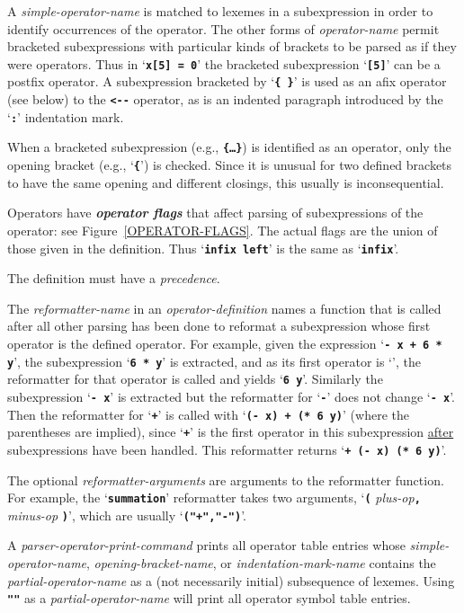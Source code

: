 \documentclass[12pt]{article}
\newcommand{\TT}[1]{{\tt \bfseries #1}}
\newcommand{\skey}[2]{{\bf \em #1#2}\index{#1}}
\begin{document}
A {\em simple-operator-name} is matched to lexemes in a subexpression
in order to identify occurrences of the operator.
The other forms of {\em operator-name} permit bracketed subexpressions
with particular kinds of brackets to be parsed as if they were operators.
Thus in `\TT{x[5] = 0}' the bracketed subexpression
`\TT{[5]}' can be a postfix operator.  A subexpression
bracketed by `\TT{\{ \}}' is used as an afix operator (see below) to the
\TT{<-{}-} operator, as is an indented paragraph introduced by the `\TT{:}'
indentation mark.

When a bracketed subexpression (e.g., \TT{\{\ldots\}}) is identified as
an operator, only the opening bracket (e.g., `\TT{\{}') is checked.
Since it is unusual for two defined brackets to have the same opening
and different closings, this usually is inconsequential.

Operators have \skey{operator flag}s that
affect parsing of subexpressions of the operator:
see Figure~\ref{OPERATOR-FLAGS}.
The actual flags are the union of those given in the definition.
Thus `\TT{infix left}' is the same as `\TT{infix}'.

The definition must have a {\em precedence}.

The {\em reformatter-name} in an {\em operator-definition} names a
function that is called after all other parsing has been done to
reformat a subexpression whose first operator is the defined operator.
For example, given the expression `\TT{- x + 6 * y}', the subexpression
`\TT{6 * y}' is extracted, and as its first operator is `\TT{*}',
the reformatter for that operator is called and yields `\TT{* 6 y}'.
Similarly the subexpression `\TT{- x}' is extracted but the reformatter
for `\TT{-}' does not change `\TT{- x}'.
Then the reformatter for `\TT{+}' is called
with `\TT{(- x) + (* 6 y)}' (where the parentheses are implied),
since `\TT{+}' is the first operator in
this subexpression \underline{after} subexpressions have been handled.
This reformatter returns `\TT{+ (- x) (* 6 y)}'.

The optional {\em reformatter-arguments} are arguments to the reformatter
function.  For example, the `\TT{summation}' reformatter takes two
arguments, `\TT{(} {\em plus-op}\TT{,} {\em minus-op} \TT{)}', which
are usually `\TT{("+","-")}'.

A {\em parser-operator-print-command}
prints all operator table entries whose
{\em simple-operator-name},
{\em opening-bracket-name}, or
{\em indentation-mark-name}
contains the {\em partial-operator-name}
as a (not necessarily initial) subsequence of lexemes.  Using \TT{""} as
a {\em partial-operator-name} will print all operator
symbol table entries.
\end{document}
